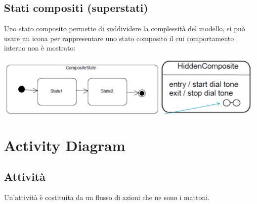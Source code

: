 \documentclass[12pt, a4paper]{report}
\begin{document}
\subsection{Stati compositi (superstati)}
Uno stato composito permette di suddividere la complessità del modello, si può  usare un icona per rappresentare uno stato composito il cui comportamento interno non è mostrato:
\begin{center}
    \includegraphics[width=.7\textwidth]{Immagini/UMLCompositeState.png}
\end{center}
\section{Activity Diagram}
\subsection{Attività}
Un'attività è costituita da un flusso di azioni che ne sono i mattoni.
\end{document}
